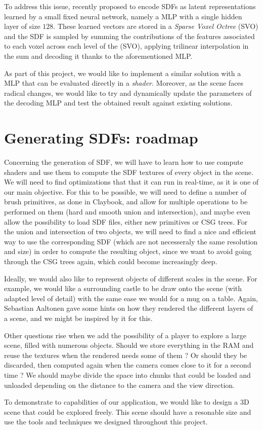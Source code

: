 \documentclass[10pt,a4paper,english, twocolumn]{article}
\begin{document}
To address this issue, \cite{takikawa2021nglod} recently proposed to encode SDFs as latent representations learned by a small fixed neural network, namely a MLP with a single hidden layer of size $128$. These learned vectors are stored in a \textit{Sparse Voxel Octree} (SVO) and the SDF is sampled by summing the contributions of the features associated to each voxel across each level of the (SVO), applying trilinear interpolation in the sum and decoding it thanks to the aforementioned MLP.

As part of this project, we would like to implement a similar solution with a MLP that can be evaluated directly in a \textit{shader}. Moreover, as the scene faces radical changes, we would like to try and dynamically update the parameters of the decoding MLP and test the obtained result against existing solutions.

\section{Generating SDFs: roadmap}

Concerning the generation of SDF, we will have to learn how to use compute shaders and use them to compute the SDF textures of every object in the scene. We will need to find optimizations that that it can run in real-time, as it is one of our main objective. For this to be possible, we will need to define a number of brush primitives, as done in Claybook, and allow for multiple operations to be performed on them (hard and smooth union and intersection), and maybe even allow the possibility to load SDF files, either new primitives or CSG trees. For the union and intersection of two objects, we will need to find a nice and efficient way to use the corresponding SDF (which are not necesseraly the same resolution and size) in order to compute the resulting object, since we want to avoid going through the CSG trees again, which could become increasingly deep.

Ideally, we would also like to represent objects of different scales in the scene. For example, we would like a surrounding castle to be draw onto the scene (with adapted level of detail) with the same ease we would for a mug on a table. Again, Sebastian Aaltonen gave some hints on how they rendered the different layers of a scene, and we might be inspired by it for this.

Other questions rise when we add the possibility of a player to explore a large scene, filled with numerous objects. Should we store everything in the RAM and reuse the textures when the rendered needs some of them ? Or should they be discarded, then computed again when the camera comes close to it for a second time ? We should maybe divide the space into chunks that could be loaded and unloaded depending on the distance to the camera and the view direction.

To demonstrate to capabilities of our application, we would like to design a 3D scene that could be explored freely. This scene should have a resonable size and use the tools and techniques we designed throughout this project. 



\end{document}

